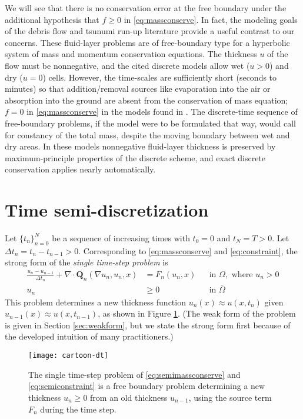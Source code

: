 \documentclass[final,leqno,onefignum,onetabnum]{siamltex1213bueler}
\newcommand\bQ{\mathbf{Q}}
\newcommand{\Div}{\nabla\cdot}
\renewcommand{\grad}{\nabla}
\begin{document}
We will see that there is no conservation error at the free boundary under the additional hypothesis that $f\ge 0$ in \eqref{eq:massconserve}.  In fact, the modeling goals of the debris flow \cite{GeorgeIverson2014} and tsunumi run-up \cite{LeVequeetal2011} literature provide a useful contrast to our concerns.  These fluid-layer problems are of free-boundary type for a hyperbolic system of mass and momentum conservation equations.  The thickness $u$ of the flow must be nonnegative, and the cited discrete models allow wet ($u>0$) and dry ($u=0$) cells.  However, the time-scales are sufficiently short (seconds to minutes) so that addition/removal sources like evaporation into the air or absorption into the ground are absent from the conservation of mass equation; $f=0$ in \eqref{eq:massconserve} in the models found in \cite{GeorgeIverson2014,LeVequeetal2011}.  The discrete-time sequence of free-boundary problems, if the model were to be formulated that way, would call for constancy of the total mass, despite the moving boundary between wet and dry areas.  In these models nonnegative fluid-layer thickness is preserved by maximum-principle properties of the discrete scheme, and exact discrete conservation applies nearly automatically.


\section{Time semi-discretization}  \label{sec:strongform}

Let $\{t_n\}_{n=0}^N$ be a sequence of increasing times with $t_0=0$ and $t_N=T>0$.  Let $\Delta t_n = t_n-t_{n-1}>0$.  Corresponding to \eqref{eq:massconserve} and \eqref{eq:constraint}, the strong form of the \emph{single time-step problem} is
\begin{align}
\frac{u_n - u_{n-1}}{\Delta t_n} + \Div \bQ_n(\grad u_n,u_n,x) &= F_n(u_n,x) &&\text{in } \Omega, \text{ where } u_n > 0 \label{eq:semimassconserve} \\
u_n &\ge 0 &&\text{in } \overline{\Omega} \label{eq:semiconstraint}
\end{align}
This problem determines a new thickness function $u_n(x) \approx u(x,t_n)$ given $u_{n-1}(x) \approx u(x,t_{n-1})$, as shown in Figure \ref{fig:timestepcartoon}.  (The weak form of the problem is given in Section \ref{sec:weakform}, but we state the strong form first because of the developed intuition of many practitioners.)

\begin{figure}[ht]
\begin{center}
\texttt{[image: cartoon-dt]}
\end{center}
\caption{The single time-step problem of \eqref{eq:semimassconserve} and \eqref{eq:semiconstraint} is a free boundary problem determining a new thickness $u_n\ge 0$ from an old thickness $u_{n-1}$, using the source term $F_n$ during the time step.}
\label{fig:timestepcartoon}
\end{figure}
\end{document}
